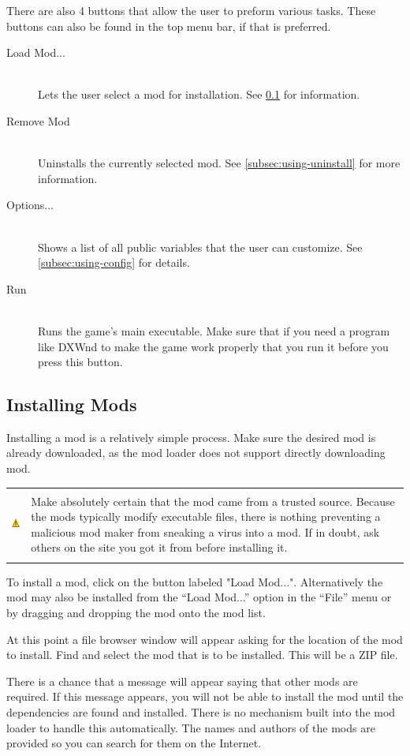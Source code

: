 \documentclass[12pt,a4paper,notitlepage]{article}
\newcommand{\warning}[1]{
	\begin{tabular}{ m{1.1cm}  m{11cm} }
	&\\
	\includegraphics[width=1.1cm, height=1.1cm]{warning} & #1
	\\&\\
	\end{tabular}
}
\begin{document}
There are also 4 buttons that allow the user to preform various tasks. These buttons can also be found in the top menu bar, if that is preferred.

\begin{description}
\item[Load Mod...] \hfill \\ 
	Lets the user select a mod for installation. See \ref{subsec:using-install} for information.
\item[Remove Mod] \hfill \\
	Uninstalls the currently selected mod. See \ref{subsec:using-uninstall} for more information.
\item[Options...] \hfill \\
	Shows a list of all public variables that the user can customize. See \ref{subsec:using-config} for details.
\item[Run] \hfill \\
	Runs the game's main executable. Make sure that if you need a program like DXWnd to make the game work properly that you run it before you press this button.

\end{description}


\subsection{Installing Mods}
\label{subsec:using-install}
Installing a mod is a relatively simple process. Make sure the desired mod is already downloaded, as the mod loader does not support directly downloading mod.

\warning{Make absolutely certain that the mod came from a trusted source. Because the mods typically modify executable files, there is nothing preventing a malicious mod maker from sneaking a virus into a mod. If in doubt, ask others on the site you got it from before installing it.}

To install a mod, click on the button labeled "Load Mod...". Alternatively the mod may also be installed from the ``Load Mod...'' option in the ``File'' menu or by dragging and dropping the mod onto the mod list.

At this point a file browser window will appear asking for the location of the mod to install. Find and select the mod that is to be installed. This will be a ZIP file.

There is a chance that a message will appear saying that other mods are required. If this message appears, you will not be able to install the mod until the dependencies are found and installed. There is no mechanism built into the mod loader to handle this automatically. The names and authors of the mods are provided so you can search for them on the Internet.
\end{document}
